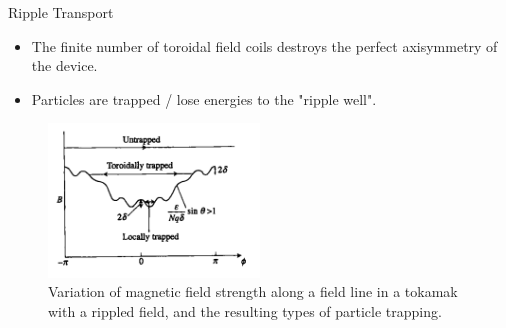 \begin{frame} {Ripple Transport}
  \begin{itemize}
    \item The finite number of toroidal field coils destroys the perfect axisymmetry of the device.
    \item Particles are trapped / lose energies to the "ripple well".
  \end{itemize}
  \begin{figure}
    \centering
    \includegraphics[width=0.5\textwidth]{figures/ripple-transport.png}
    \caption{Variation of magnetic field strength along a field line in a tokamak with a rippled field, and the resulting types of particle trapping.}
    \label{fig:ripple-transport}
  \end{figure}
\end{frame}
